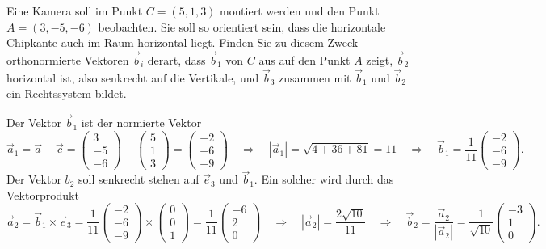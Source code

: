 Eine Kamera soll im Punkt $C=(5,1,3)$ montiert werden und den Punkt
$A=(3,-5,-6)$ beobachten.
Sie soll so orientiert sein, dass die horizontale Chipkante auch im 
Raum horizontal liegt.
Finden Sie zu diesem Zweck orthonormierte Vektoren $\vec{b}_i$ derart,
dass $\vec{b}_1$ von $C$ aus auf den Punkt $A$ zeigt,
$\vec{b}_2$ horizontal ist, also senkrecht auf die Vertikale,
und $\vec{b}_3$ zusammen mit $\vec{b}_1$ und $\vec{b}_2$ ein
Rechtssystem bildet.

\begin{loesung}
Der Vektor $\vec{b}_1$  ist der normierte Vektor
\[
\vec{a}_1
=
\vec{a}-\vec{c}
=
\begin{pmatrix} 3\\-5\\-6 \end{pmatrix}
-
\begin{pmatrix} 5\\1\\3\end{pmatrix}
=
\begin{pmatrix} -2\\-6\\-9\end{pmatrix}
\quad\Rightarrow\quad
|\vec{a}_1|
=
\sqrt{4+36+81}=11
\quad\Rightarrow\quad
\vec{b}_1
=
\frac{1}{11}
\begin{pmatrix} -2\\-6\\-9\end{pmatrix}.
\]
Der Vektor $b_2$ soll senkrecht stehen auf $\vec{e}_3$ und $\vec{b}_1$.
Ein solcher wird durch das Vektorprodukt
\[
\vec{a}_2
=
\vec{b}_1\times\vec{e}_3
=
\frac{1}{11}
\begin{pmatrix} -2\\-6\\-9\end{pmatrix}
\times
\begin{pmatrix} 0\\0\\1\end{pmatrix}
=
\frac1{11}
\begin{pmatrix} -6\\2\\ 0 \end{pmatrix}
\quad\Rightarrow\quad
|\vec{a}_2|
= 
\frac{2\sqrt{10}}{11}
\quad\Rightarrow\quad
\vec{b}_2
=
\frac{\vec{a}_2}{|\vec{a}_2|}
=
\frac{1}{\sqrt{10}}
\begin{pmatrix} -3\\1\\ 0 \end{pmatrix}.
\]
\end{loesung}
